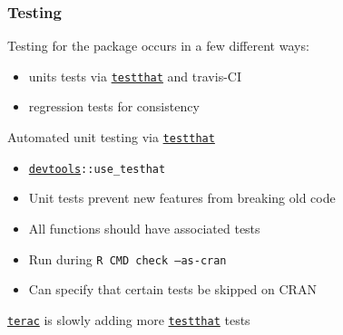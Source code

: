\documentclass[12 pt]{beamer}\usepackage[]{graphicx}\usepackage[]{color}
\newcommand{\hlkwd}[1]{\textcolor[rgb]{0.78,0.227,0.412}{#1}}%
\newcommand{\mxkwd}[1]{\texttt{\hlkwd{#1}}}%
\newcommand{\pkg}[1]{{\fontseries{b}\selectfont #1}}
\renewcommand{\pkg}[1]{{\color{darkgreen}\texttt{#1}}}
\begin{document}
  \begin{frame}[fragile]
\frametitle{Testing}

Testing for the package occurs in a few different ways:
\begin{itemize}
\item units tests via \href{http://cran.r-project.org/web/packages/testthat/index.html}{\pkg{testthat}} and travis-CI
\item regression tests for consistency
\end{itemize}

\vspace{.2in}

Automated unit testing via \href{http://cran.r-project.org/web/packages/testthat/index.html}{\pkg{testthat}}

\begin{itemize}
\item \href{http://cran.r-project.org/web/packages/testthat/index.html}{\pkg{devtools}}{\tt ::\mxkwd{use\_testhat}}
\item Unit tests prevent new features from breaking old code
\item All functions should have associated tests
\item Run during {\tt R CMD check --as-cran}
\item Can specify that certain tests be skipped on CRAN
\end{itemize}

\href{http://cran.r-project.org/web/packages/terac/index.html}{\pkg{terac}} is slowly adding more \href{http://cran.r-project.org/web/packages/testthat/index.html}{\pkg{testthat}} tests

\end{frame}

\end{document}
